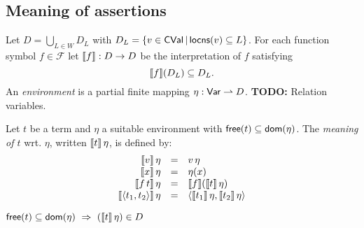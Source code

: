 \documentclass[12pt,a4paper]{article}
\newcommand{\CVal}{\sstyle{CVal}}
\begin{document}
\subsection{Meaning of assertions}

Let $D = \bigcup_{L\in W} D_L$ with $D_L = \{v\in\CVal\,|\,\locns{v} \subseteq L\}$.
For each function symbol $f\in\mathcal{F}$ let
$\llbracket f\rrbracket: D \to D$ be the interpretation of $f$ satisfying
\[
\llbracket f\rrbracket(D_L) \subseteq D_L.
\]
An {\em environment} is a partial finite mapping $\eta:\mathsf{Var} \rightharpoonup D$. {\bf TODO:} Relation variables.

\begin{definition}
  Let $t$ be a term and $\eta$ a suitable environment with $\mathsf{free}(t) \subseteq \mathsf{dom}(\eta)$.
  The {\em meaning of $t$} wrt. $\eta$, written $\llbracket t\rrbracket\,\eta$, is defined by:
  \[\begin{array}{rcl}
    \llbracket v\rrbracket\,\eta
    &=& v\,\eta \\
    \llbracket x\rrbracket\,\eta
    &=& \eta(x) \\
    \llbracket f\,t\rrbracket\,\eta
    &=& \llbracket f\rrbracket(\llbracket t\rrbracket\,\eta) \\
    \llbracket\langle t_1,t_2 \rangle\rrbracket\,\eta
    &=& \langle \llbracket t_1\rrbracket\,\eta,\llbracket t_2\rrbracket\,\eta \rangle
  \end{array}\]
\end{definition}

\begin{lemma}
  $\free{t} \subseteq \dom{\eta} \ \Rightarrow\  (\semantic{t}\,\eta)\in D$
\end{lemma}
\end{document}
